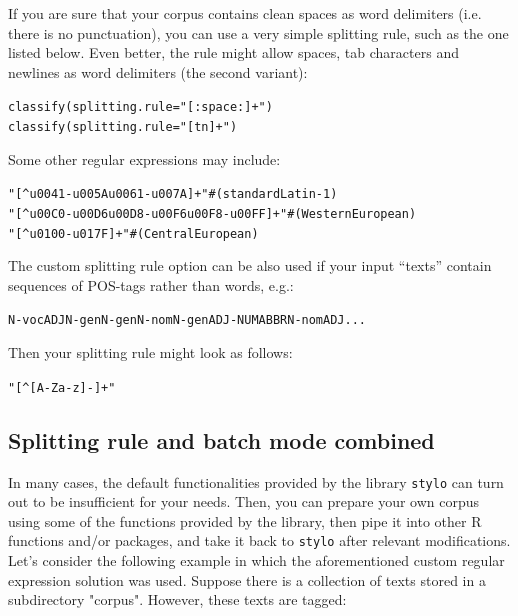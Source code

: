 \documentclass[11pt,a4paper]{article}
\def\code#1{{\tt #1}}
\begin{document}
If you are sure that your corpus contains clean spaces as word delimiters (i.e. there is no punctuation), you can use a very simple splitting rule, such as the one listed below. Even better, the rule might allow spaces, tab characters and newlines as word delimiters (the second variant):

\begin{alltt}
    classify(splitting.rule="[:space:]+")
    classify(splitting.rule="[ tn]+")
\end{alltt}

\noindent
Some other regular expressions may include:

\begin{alltt}
    "[\^{}u0041-{}u005Au0061-u007A]+"               # (standard Latin-1)
    "[\^{}u00C0-u00D6u00D8-u00F6u00F8-u00FF]+"  # (Western European)
    "[\^{}u0100-u017F]+"                            # (Central European)
\end{alltt}

\noindent
The custom splitting rule option can be also used if your input ``texts'' contain sequences of POS-tags rather than words, e.g.:

\begin{alltt}
    N-voc ADJ N-gen N-gen N-nom N-gen ADJ-NUM ABBR N-nom ADJ ...
\end{alltt}

\noindent
Then your splitting rule might look as follows:

\begin{alltt}
    "[\^{}[A-Za-z]-]+"
\end{alltt}




\subsection{Splitting rule and batch mode combined}

In many cases, the default functionalities provided by the 
library \code{stylo} can turn out to be insufficient for your needs. 
Then, you can prepare your own corpus using some of the functions provided 
by the library, then pipe it into other R functions and/or packages, and 
take it back to \code{stylo} after relevant modifications. Let's consider 
the following example in which the aforementioned custom regular expression 
solution was used. Suppose there is a collection of texts stored in a 
subdirectory "corpus". However, these texts are tagged:
\end{document}
